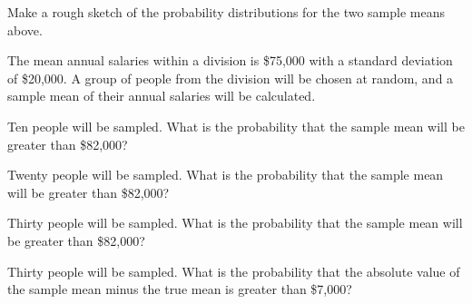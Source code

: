 \begin{problem}
\begin{subproblem}
      \vfill

    \item Make a rough sketch of the probability distributions for the
      two sample means above.

      \vfill

  \end{subproblem}

\clearpage

  \item The mean annual salaries within a division is \$75,000 with a
    standard deviation of \$20,000. A group of people from the
    division will be chosen at random, and a sample mean of their
    annual salaries will be calculated.
  \begin{subproblem}
    \item Ten people will be sampled. What is the probability that the
      sample mean will be greater than \$82,000?

      \vfill

    \item Twenty people will be sampled. What is the probability that the
      sample mean will be greater than \$82,000?

      \vfill

    \item Thirty people will be sampled. What is the probability that
      the sample mean will be greater than \$82,000?

      \vfill

    \item Thirty people will be sampled. What is the probability that
      the absolute value of the sample mean minus the true mean is
      greater than \$7,000?

      \vfill

  \end{subproblem}


\end{problem}


